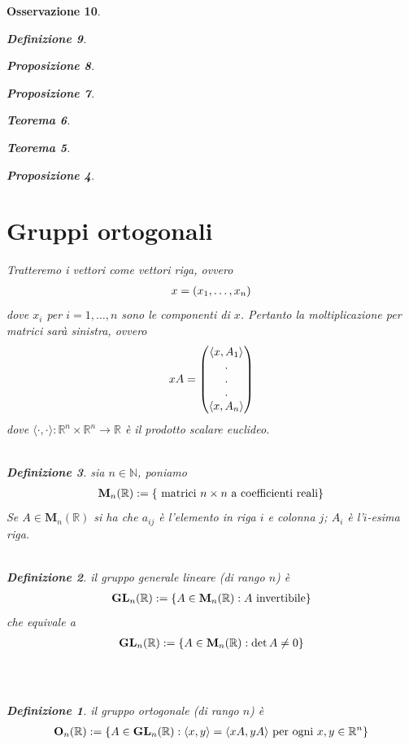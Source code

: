\documentclass[oneside, 11pt]{amsbook}
\newcommand{\0}{{(0)}}
\newcommand{\3}{{(3)}}
\theoremstyle{colonplain}
\newtheorem{thm}{Teorema}[chapter]
\newtheorem{prop}[thm]{Proposizione}
\theoremstyle{colondefinition}
\newtheorem{defn}[thm]{Definizione}
\theoremstyle{colonremark}
\newtheorem{rmk}[thm]{Osservazione}
\numberwithin{equation}{chapter}
\begin{document}
\begin{rmk}
\begin{defn}
\begin{prop}
\begin{prop}
\begin{thm}
\begin{thm}
\begin{prop}
\section{Gruppi ortogonali}
Tratteremo i vettori come vettori riga, ovvero
\begin{align}
    x = (x_1, \dots, x_n) \notag
\end{align}
dove $x_i$ per $i = 1, \dots, n$ sono le componenti di $x$. Pertanto la moltiplicazione per matrici sarà sinistra, ovvero
\begin{align}
    xA = \begin{pmatrix}
        \langle x, A_1 \rangle \\
        . \\
        . \\
        . \\
        \langle x, A_n \rangle
    \end{pmatrix} \notag
\end{align}
dove $\langle \cdot, \cdot \rangle : \mathbb{R}^n \times \mathbb{R}^n \longrightarrow \mathbb{R}$ è il prodotto scalare euclideo. \\ \\
\begin{defn} sia $n \in \mathbb{N}$, poniamo
\begin{align}
    \mathbf{M}_n(\mathbb{R}) := \{ \text{ matrici $n \times n$ a coefficienti reali} \} \notag
\end{align}
Se $A \in \mathbf{M}_n(\mathbb{R})$ si ha che $a_{ij}$ è l'elemento in riga $i$ e colonna $j$; $A_i$ è l'$i$-esima riga. \\ \\
\begin{defn} il \textit{gruppo generale lineare} (di rango $n$) è
\begin{align}
    \mathbf{GL}_n(\mathbb{R}) := \{ A \in \mathbf{M}_n(\mathbb{R}) : A \text{ invertibile} \} \notag
\end{align}
che equivale a
\begin{align}
    \mathbf{GL}_n(\mathbb{R}) := \{ A \in \mathbf{M}_n(\mathbb{R}) : \det A \neq 0 \} \notag
\end{align} \\ \\
\begin{defn} il \textit{gruppo ortogonale} (di rango $n$) è
\begin{align}
    \mathbf{O}_n(\mathbb{R}) := \{ A \in \mathbf{GL}_n(\mathbb{R}) : \langle x, y \rangle = \langle xA, yA \rangle \text{ per ogni } x, y \in \mathbb{R}^n \} \notag

\end{align}
\end{defn}
\end{defn}
\end{defn}
\end{prop}
\end{thm}
\end{thm}
\end{prop}
\end{prop}
\end{defn}
\end{rmk}
\end{document}
